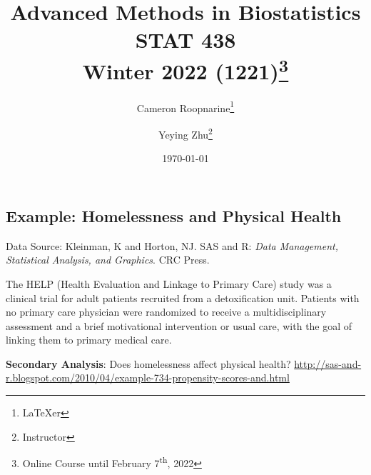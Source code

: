 \documentclass[oneside]{book}\usepackage[]{graphicx}\usepackage[svgnames]{xcolor}
\title{%
\LARGE Advanced Methods in Biostatistics\\%
\large STAT 438\\%
\normalsize Winter 2022 (1221)\thanks{Online Course until February 7\textsuperscript{th}, 2022}}%
\author{Cameron Roopnarine\thanks{\LaTeX{}er}\and Yeying Zhu\thanks{Instructor}}%
\date{\today}%
\begin{document}
\maketitle
\tableofcontents





\subsection*{Example: Homelessness and Physical Health}
Data Source: Kleinman, K and Horton, NJ. SAS and R: \emph{Data
      Management, Statistical Analysis, and Graphics}. CRC Press.

The HELP (Health Evaluation and Linkage to Primary Care) study
was a clinical trial for adult patients recruited from a detoxification
unit. Patients with no primary care physician were randomized to
receive a multidisciplinary assessment and a brief motivational
intervention or usual care, with the goal of linking them to primary
medical care.

\textbf{Secondary Analysis}: Does homelessness affect physical health?
\url{http://sas-and-r.blogspot.com/2010/04/example-734-propensity-scores-and.html}
\end{document}
